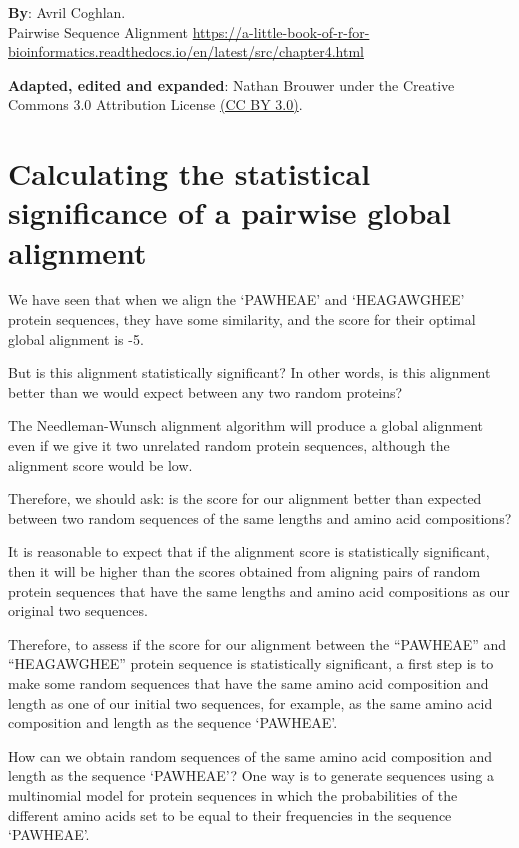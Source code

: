 \documentclass[
]{book}
\begin{document}
\textbf{By}: Avril Coghlan.\\
Pairwise Sequence Alignment
\url{https://a-little-book-of-r-for-bioinformatics.readthedocs.io/en/latest/src/chapter4.html}

\textbf{Adapted, edited and expanded}: Nathan Brouwer under the Creative Commons 3.0 Attribution License \href{https://creativecommons.org/licenses/by/3.0/}{(CC BY 3.0)}.

\hypertarget{calculating-the-statistical-significance-of-a-pairwise-global-alignment}{%
\section{Calculating the statistical significance of a pairwise global alignment}\label{calculating-the-statistical-significance-of-a-pairwise-global-alignment}}

We have seen that when we align the `PAWHEAE' and `HEAGAWGHEE' protein sequences, they have some similarity, and the score for their optimal global alignment is -5.

But is this alignment statistically significant? In other words, is this alignment better than we would expect between any two random proteins?

The Needleman-Wunsch alignment algorithm will produce a global alignment even if we give it two unrelated random protein sequences, although the alignment score would be low.

Therefore, we should ask: is the score for our alignment better than expected between two random sequences of the same lengths and amino acid compositions?

It is reasonable to expect that if the alignment score is statistically significant, then it will be higher than the scores obtained from aligning pairs of random protein sequences that have the same lengths and amino acid compositions as our original two sequences.

Therefore, to assess if the score for our alignment between the ``PAWHEAE'' and ``HEAGAWGHEE'' protein sequence is statistically significant, a first step is to make some random sequences that have the same amino acid composition and length as one of our initial two sequences, for example, as the same amino acid composition and length as the sequence `PAWHEAE'.

How can we obtain random sequences of the same amino acid composition and length as the sequence `PAWHEAE'? One way is to generate sequences using a multinomial model for protein sequences in which the probabilities of the different amino acids set to be equal to their frequencies in the sequence `PAWHEAE'.
\end{document}
